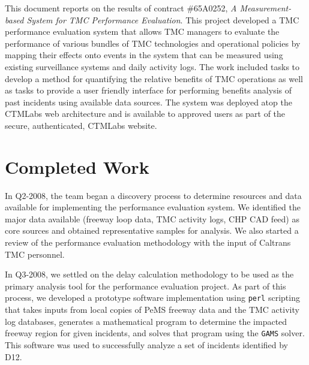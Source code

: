 
This document reports on the results of contract \#65A0252, \emph{A
  Measurement-based System for TMC Performance Evaluation}.  This
project developed a TMC performance evaluation system that allows TMC
managers to evaluate the performance of various bundles of TMC
technologies and operational policies by mapping their effects onto
events in the system that can be measured using existing surveillance
systems and daily activity logs.  The work included tasks to develop a
method for quantifying the relative benefits of TMC operations as well
as tasks to provide a user friendly interface for performing benefits
analysis of past incidents using available data sources.  The system
was deployed atop the CTMLabs web architecture and is available to
approved users as part of the secure, authenticated, CTMLabs website.


\section*{Completed Work}
\label{execsum-sum-of-work}

In Q2-2008, the team began a discovery process to determine resources and data
available for implementing the performance evaluation system. We identified the
major data available (freeway loop data, TMC activity logs, CHP CAD feed) as
core sources and obtained representative samples for analysis.  We also started
a review of the performance evaluation methodology with the input of Caltrans
TMC personnel.

In Q3-2008, we settled on the delay calculation methodology to be used as the
primary analysis tool for the performance evaluation project.  As part of this
process, we developed a prototype software implementation using \texttt{perl}
scripting that takes inputs from local copies of PeMS freeway data and the TMC
activity log databases, generates a mathematical program to determine the
impacted freeway region for given incidents, and solves that program using the
\texttt{GAMS} solver.  This software was used to successfully analyze a set of
incidents identified by D12.

